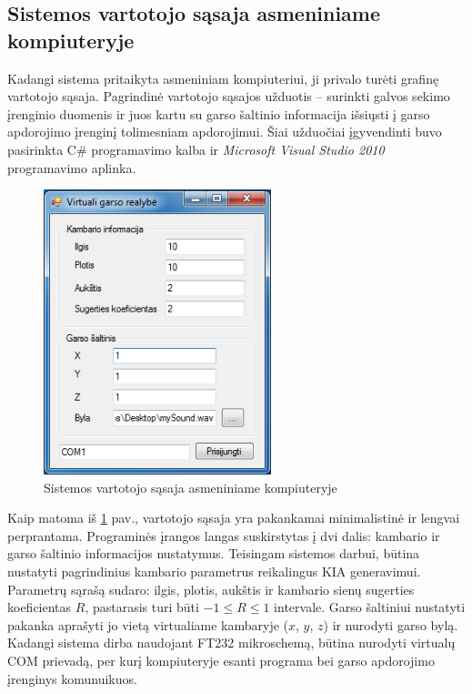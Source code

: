 \documentclass[]{vgtuef}
\begin{document}
%  

\newpage

\subsection{Sistemos vartotojo sąsaja asmeniniame kompiuteryje}

Kadangi sistema pritaikyta asmeniniam kompiuteriui, ji privalo turėti grafinę vartotojo sąsaja. Pagrindinė vartotojo sąsajos užduotis -- surinkti galvos sekimo įrenginio duomenis ir juos kartu su garso šaltinio informacija išsiųsti į garso apdorojimo įrenginį tolimesniam apdorojimui. Šiai užduočiai įgyvendinti buvo pasirinkta C\# programavimo kalba ir \textit{Microsoft Visual Studio 2010} programavimo aplinka.

\begin{figure}[htbp]
  \centering
  \includegraphics[width=250px]{img/GUI.png}
  \caption{Sistemos vartotojo sąsaja asmeniniame kompiuteryje}
  \label{fig:GUI}
\end{figure}

Kaip matoma iš \ref{fig:GUI} pav., vartotojo sąsaja yra pakankamai minimalistinė ir lengvai perprantama. Programinės įrangos langas suskirstytas į dvi dalis: kambario ir garso šaltinio informacijos nustatymus.
Teisingam sistemos darbui, būtina nustatyti pagrindinius kambario parametrus reikalingus KIA generavimui. Parametrų sąrašą sudaro: ilgis, plotis, aukštis ir kambario sienų sugerties koeficientas $R$, pastarasis turi būti $-1 \leq R \leq 1$ intervale.
Garso šaltiniui nustatyti pakanka aprašyti jo vietą virtualiame kambaryje ($x$, $y$, $z$) ir nurodyti garso bylą.
Kadangi sistema dirba naudojant FT232 mikroschemą, būtina nurodyti virtualų COM prievadą, per kurį kompiuteryje esanti programa bei garso apdorojimo įrenginys komunuikuos. 
\end{document}
